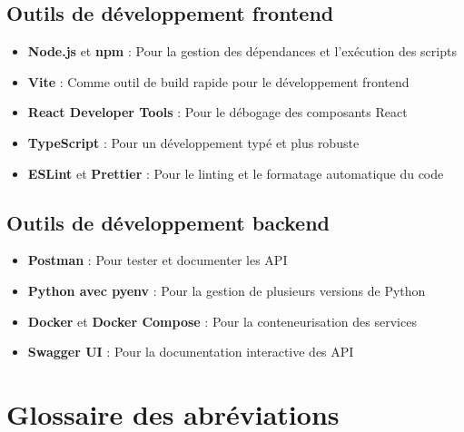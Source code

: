 \subsection{Outils de développement frontend}

\begin{itemize}
  \item \textbf{Node.js} et \textbf{npm} : Pour la gestion des dépendances et l'exécution des scripts
  
  \item \textbf{Vite} : Comme outil de build rapide pour le développement frontend
  
  \item \textbf{React Developer Tools} : Pour le débogage des composants React
  
  \item \textbf{TypeScript} : Pour un développement typé et plus robuste
  
  \item \textbf{ESLint} et \textbf{Prettier} : Pour le linting et le formatage automatique du code
\end{itemize}

\subsection{Outils de développement backend}

\begin{itemize}
  \item \textbf{Postman} : Pour tester et documenter les API
  
  \item \textbf{Python avec pyenv} : Pour la gestion de plusieurs versions de Python
  
  \item \textbf{Docker} et \textbf{Docker Compose} : Pour la conteneurisation des services
  
  \item \textbf{Swagger UI} : Pour la documentation interactive des API
\end{itemize}

\section{Glossaire des abréviations}

